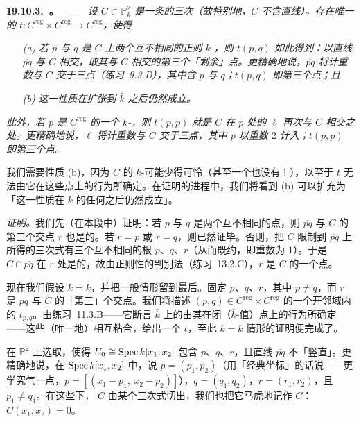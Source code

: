 \textbf{19.10.3.\ \trhProposition。}\ ——\ \emph{设 $C\subset\mathbb{P}^2_k$ 是一条\trGeometricallyIntegral{}的三次\trCurve（故特别地，$C$ 不含直线）。存在唯一的\trMorphism{} $t\colon C^{\mathrm{reg}}\times C^{\mathrm{reg}}\to C^{\mathrm{reg}}$，使得}
\begin{itemize}
\item[\emph{(a)}] \emph{若 $p$ 与 $q$ 是 $C$ 上两个互不相同的正则 $k$-\trValuedPoint，则 $t(p,q)$ 如此得到：以直线 $\overline{pq}$ 与 $C$ 相交，取其与 $C$ 相交的第三个「剩余」点。更精确地说，$\overline{pq}$ 将计重数与 $C$ 交于三点（\mbox{练习~9.3.D}），其中含 $p$ 与 $q$；$t(p,q)$ 即第三个点；且}
\item[\emph{(b)}] \emph{这一性质在扩张到 $\bar{k}$ 之后仍然成立。}
\end{itemize}
\emph{此外，若 $p$ 是 $C^{\mathrm{reg}}$ 的一个 $k$-\trValuedPoint，则 $t(p,p)$ 就是 $C$ 在 $p$ 处的\trTangentLine{} $\ell$ 再次与 $C$ 相交之处。更精确地说，$\ell$ 将计重数与 $C$ 交于三点，其中 $p$ 以重数 $2$ 计入；$t(p,p)$ 即第三个点。}

我们需要性质 (b)，因为 $C$ 的 $k$-\trValuedPoint{}可能少得可怜（甚至一个也没有！），以至于\trMorphism{} $t$ 无法由它在这些点上的行为所确定。在证明的进程中，我们将看到 (b) 可以扩充为「这一性质在 $k$ 的任何\trFieldExtension{}之后仍然成立」。

\emph{证明。}\quad 我们先（在本段中）证明：若 $p$ 与 $q$ 是两个互不相同的\trRegular{}点，则 $\overline{pq}$ 与 $C$ 的第三个交点 $r$ 也是\trRegular{}的。若 $r=p$ 或 $r=q$，则已然证毕。否则，把 $C$ 限制到 $\overline{pq}$ 上所得的三次式有三个互不相同的根 $p$、$q$、$r$（从而既约，即重数为 $1$）。于是 $C\cap\overline{pq}$ 在 $r$ 处是\trRegular{}的，故由正则性的\trSlicing{}判别法（\mbox{练习~13.2.C}），$r$ 是 $C$ 的一个\trRegular{}点。

现在我们假设 $k=\bar{k}$，并把一般情形留到最后。固定 $p$、$q$、$r$，其中 $p\ne q$，而 $r$ 是 $\overline{pq}$ 与 $C$ 的「第三」个交点。我们将描述 $(p,q)\in C^{\mathrm{reg}}\times C^{\mathrm{reg}}$ 的一个开邻域内的\trMorphism{} $t_{p,q}$。由\mbox{练习~11.3.B}——它断言 $\bar{k}$ 上\trVariety{}的\trMorphism{}由其在闭（$\bar{k}$-值）点上的行为所确定——这些\trMorphism（唯一地）相互粘合，给出一个\trMorphism{} $t$，至此 $k=\bar{k}$ 情形的证明便完成了。

在 $\mathbb{P}^2$ 上选取\trProjective\trCoordinate，使得 $U_0\cong\operatorname{Spec} k[x_1,x_2]$ 包含 $p$、$q$、$r$，且直线 $\overline{pq}$ 不「竖直」。更精确地说，在 $\operatorname{Spec} k[x_1,x_2]$ 中，说 $p=(p_1,p_2)$（用「经典坐标」的话说——更学究气一点，$p=[(x_1-p_1,\ x_2-p_2)]$），$q=(q_1,q_2)$，$r=(r_1,r_2)$，且 $p_1\ne q_1$。在这些\trCoordinate{}下，\trCurve{} $C$ 由某个三次式切出，我们也把它马虎地记作 $C$：$C(x_1,x_2)=0$。

